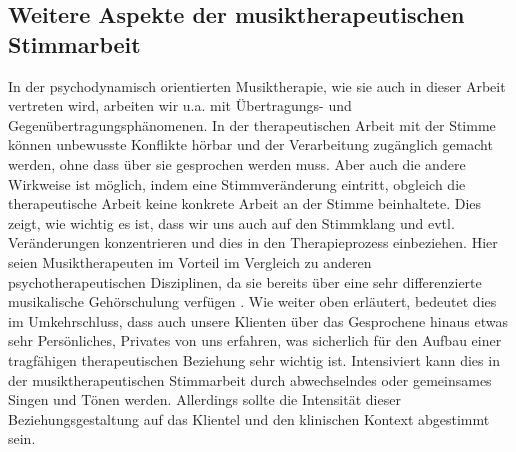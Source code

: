 \subsection{Weitere Aspekte der musiktherapeutischen Stimmarbeit}
In der psychodynamisch orientierten Musiktherapie, wie sie auch in dieser Arbeit vertreten wird, arbeiten wir u.a. mit Übertragungs- und Gegenübertragungsphänomenen. In der therapeutischen Arbeit mit der Stimme können unbewusste Konflikte hörbar und der Verarbeitung zugänglich gemacht werden, ohne dass über sie gesprochen werden muss. Aber auch die andere Wirkweise ist möglich, indem eine Stimmveränderung eintritt, obgleich die therapeutische Arbeit keine konkrete Arbeit an der Stimme beinhaltete. Dies zeigt, wie wichtig es ist, dass wir uns auch auf den Stimmklang und evtl. Veränderungen konzentrieren und dies in den Therapieprozess einbeziehen. Hier seien Musiktherapeuten im Vorteil im Vergleich zu anderen psychotherapeutischen Disziplinen, da sie bereits über eine sehr differenzierte musikalische Gehörschulung verfügen \autocite[vgl.][212]{rittner2008}. Wie weiter oben erläutert, bedeutet dies im Umkehrschluss, dass auch unsere Klienten über das Gesprochene hinaus etwas sehr Persönliches, Privates von uns erfahren, was sicherlich für den Aufbau einer tragfähigen therapeutischen Beziehung sehr wichtig ist. Intensiviert kann dies in der musiktherapeutischen Stimmarbeit durch abwechselndes oder gemeinsames Singen und Tönen werden. Allerdings sollte die Intensität dieser Beziehungsgestaltung auf das Klientel und den klinischen Kontext abgestimmt sein.

